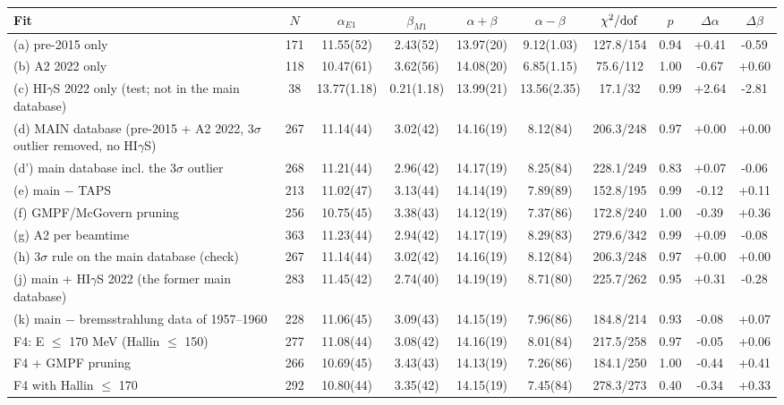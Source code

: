 \begin{tabular}{lccccccccc}
\hline
Fit & $N$ & $\alpha_{E1}$ & $\beta_{M1}$ & $\alpha+\beta$ & $\alpha-\beta$ & $\chi^2/{\rm dof}$ & $p$ & $\Delta\alpha$ & $\Delta\beta$ \\
\hline
(a) pre-2015 only & 171 & 11.55(52) & 2.43(52) & 13.97(20) & 9.12(1.03) & 127.8/154 & 0.94 & +0.41 & -0.59 \\
(b) A2 2022 only & 118 & 10.47(61) & 3.62(56) & 14.08(20) & 6.85(1.15) & 75.6/112 & 1.00 & -0.67 & +0.60 \\
(c) HI$\gamma$S 2022 only (test; not in the main database) & 38 & 13.77(1.18) & 0.21(1.18) & 13.99(21) & 13.56(2.35) & 17.1/32 & 0.99 & +2.64 & -2.81 \\
(d) MAIN database (pre-2015 + A2 2022, 3$\sigma$ outlier removed, no HI$\gamma$S) & 267 & 11.14(44) & 3.02(42) & 14.16(19) & 8.12(84) & 206.3/248 & 0.97 & +0.00 & +0.00 \\
(d') main database incl. the 3$\sigma$ outlier & 268 & 11.21(44) & 2.96(42) & 14.17(19) & 8.25(84) & 228.1/249 & 0.83 & +0.07 & -0.06 \\
(e) main $-$ TAPS & 213 & 11.02(47) & 3.13(44) & 14.14(19) & 7.89(89) & 152.8/195 & 0.99 & -0.12 & +0.11 \\
(f) GMPF/McGovern pruning & 256 & 10.75(45) & 3.38(43) & 14.12(19) & 7.37(86) & 172.8/240 & 1.00 & -0.39 & +0.36 \\
(g) A2 per beamtime & 363 & 11.23(44) & 2.94(42) & 14.17(19) & 8.29(83) & 279.6/342 & 0.99 & +0.09 & -0.08 \\
(h) 3$\sigma$ rule on the main database (check) & 267 & 11.14(44) & 3.02(42) & 14.16(19) & 8.12(84) & 206.3/248 & 0.97 & +0.00 & +0.00 \\
(j) main + HI$\gamma$S 2022 (the former main database) & 283 & 11.45(42) & 2.74(40) & 14.19(19) & 8.71(80) & 225.7/262 & 0.95 & +0.31 & -0.28 \\
(k) main $-$ bremsstrahlung data of 1957–1960 & 228 & 11.06(45) & 3.09(43) & 14.15(19) & 7.96(86) & 184.8/214 & 0.93 & -0.08 & +0.07 \\
F4: E $\le$ 170 MeV (Hallin $\le$ 150) & 277 & 11.08(44) & 3.08(42) & 14.16(19) & 8.01(84) & 217.5/258 & 0.97 & -0.05 & +0.06 \\
F4 + GMPF pruning & 266 & 10.69(45) & 3.43(43) & 14.13(19) & 7.26(86) & 184.1/250 & 1.00 & -0.44 & +0.41 \\
F4 with Hallin $\le$ 170 & 292 & 10.80(44) & 3.35(42) & 14.15(19) & 7.45(84) & 278.3/273 & 0.40 & -0.34 & +0.33 \\
\hline
\end{tabular}

